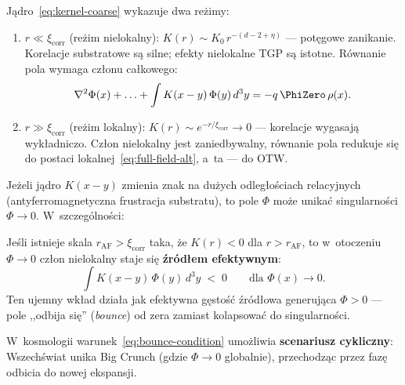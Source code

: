 \begin{proposition}\label{prop:kernel-regimes}
J\k{a}dro~\eqref{eq:kernel-coarse} wykazuje dwa re\.zimy:
\begin{enumerate}[nosep]
  \item \textbf{$r \ll \xi_{\mathrm{corr}}$} (re\.zim nielokalny):
    $K(r) \sim K_0\,r^{-(d-2+\eta)}$ --- pot\k{e}gowe zanikanie.
    Korelacje substratowe s\k{a} silne; efekty nielokalne TGP
    s\k{a} istotne. R\'ownanie pola wymaga cz\l{}onu
    ca\l{}kowego:
    \begin{equation}\label{eq:nonlocal-term}
      \nabla^2\Phi(x) + \ldots
      + \int K(x-y)\,\Phi(y)\,d^3y = -q\,\PhiZero\,\rho(x).
    \end{equation}
  \item \textbf{$r \gg \xi_{\mathrm{corr}}$} (re\.zim lokalny):
    $K(r) \sim e^{-r/\xi_{\mathrm{corr}}} \to 0$ ---
    korelacje wygasaj\k{a} wyk\l{}adniczo. Cz\l{}on nielokalny
    jest zaniedbywalny, r\'ownanie pola redukuje si\k{e} do
    postaci lokalnej~\eqref{eq:full-field-alt}, a~ta --- do OTW.
\end{enumerate}
\end{proposition}

\begin{hypothesis}\label{hyp:bounce}
Je\.zeli j\k{a}dro $K(x-y)$ zmienia znak na du\.zych
odleg\l{}o\'sciach relacyjnych (antyferromagnetyczna frustracja
substratu), to pole $\Phi$ mo\.ze unika\'c singularno\'sci
$\Phi \to 0$. W~szczeg\'olno\'sci:

Je\'sli istnieje skala $r_{\mathrm{AF}} > \xi_{\mathrm{corr}}$
taka, \.ze $K(r) < 0$ dla $r > r_{\mathrm{AF}}$, to
w~otoczeniu $\Phi \to 0$ cz\l{}on nielokalny staje si\k{e}
\textbf{\'zr\'od\l{}em efektywnym}:
\begin{equation}\label{eq:bounce-condition}
  \int K(x-y)\,\Phi(y)\,d^3y \;<\; 0
  \qquad\text{dla } \Phi(x) \to 0.
\end{equation}
Ten ujemny wk\l{}ad dzia\l{}a jak efektywna g\k{e}sto\'s\'c
\'zr\'od\l{}owa generuj\k{a}ca $\Phi > 0$ --- pole ,,odbija si\k{e}''
(\emph{bounce}) od zera zamiast kolapsowa\'c do singularno\'sci.

W~kosmologii warunek~\eqref{eq:bounce-condition} umo\.zliwia
\textbf{scenariusz cykliczny}: Wszech\'swiat unika Big Crunch
(gdzie $\Phi \to 0$ globalnie), przechodz\k{a}c przez faz\k{e}
odbicia do nowej ekspansji.
\end{hypothesis}

